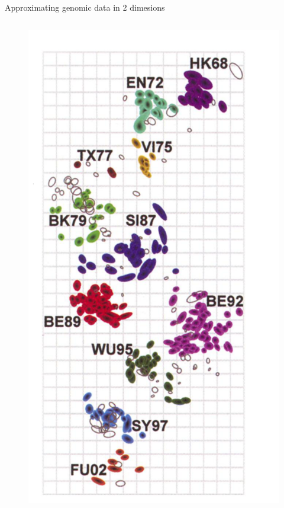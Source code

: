 \documentclass{beamer}
\begin{document}
\begin{frame}{Approximating genomic data in 2 dimesions }
    \begin{columns}
        \begin{column}{0.4\textwidth}
        \begin{figure}
        \includegraphics[width=\textwidth]{influenza_map/smith_antigenic_2.png}    
        \end{figure}   
    \end{column}

\end{columns}
\end{frame}
\end{document}
